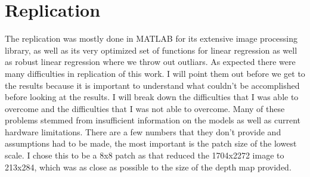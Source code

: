 \documentclass[journal]{IEEEtran}
\begin{document}
\section{Replication}
The replication was mostly done in MATLAB for its extensive image processing library, as well as its very optimized set of functions for linear regression as well as robust linear regression where we throw out outliars. As expected there were many difficulties in replication of this work. I will point them out before we get to the results because it is important to understand what couldn't be accomplished before looking at the results. I will break down the difficulties that I was able to overcome and the difficulties that I was not able to overcome. Many of these problems stemmed from insufficient information on the models as well as current hardware limitations. There are a few numbers that they don't provide and assumptions had to be made, the most important is the patch size of the lowest scale. I chose this to be a 8x8 patch as that reduced the 1704x2272 image to 213x284, which was as close as possible to the size of the depth map provided.
\end{document}
